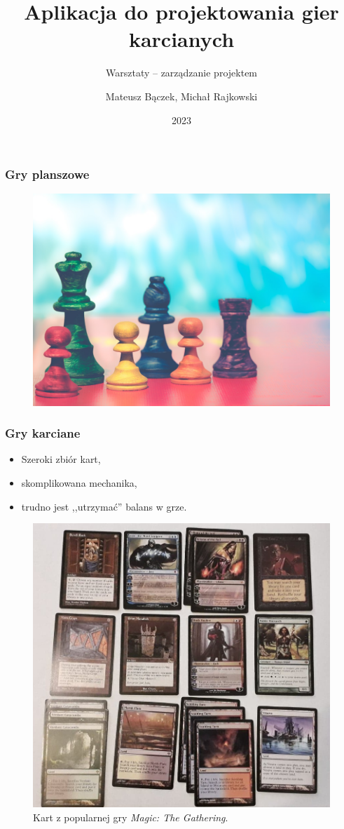 \documentclass[]{beamer}
\title{Aplikacja do projektowania gier karcianych}
\subtitle{Warsztaty -- zarządzanie projektem}
\author{Mateusz Bączek, Michał Rajkowski}
\institute{Politechnika Wrocławska}
\date{2023}
\begin{document}
\frame{\titlepage}


\begin{frame}
\frametitle{Gry planszowe}
  \begin{figure}
    \centering
    \includegraphics[width=0.7\linewidth]{board_game.jpg}
  \end{figure}
  \vspace{-0.5cm}

\end{frame}

\begin{frame}
\frametitle{Gry karciane}

  \begin{multicols}{2}

    \begin{itemize}
      \item Szeroki zbiór kart,
      \item skomplikowana mechanika,
      \item trudno jest ,,utrzymać'' balans w grze.
    \end{itemize}
  \begin{figure}
    \centering
    \includegraphics[width=0.7\linewidth]{gathering.jpg}
    \caption{Kart z popularnej gry \textit{Magic: The Gathering}.}
  \end{figure}
  \vspace{-0.5cm}
  \end{multicols}

\end{frame}
\end{document}
